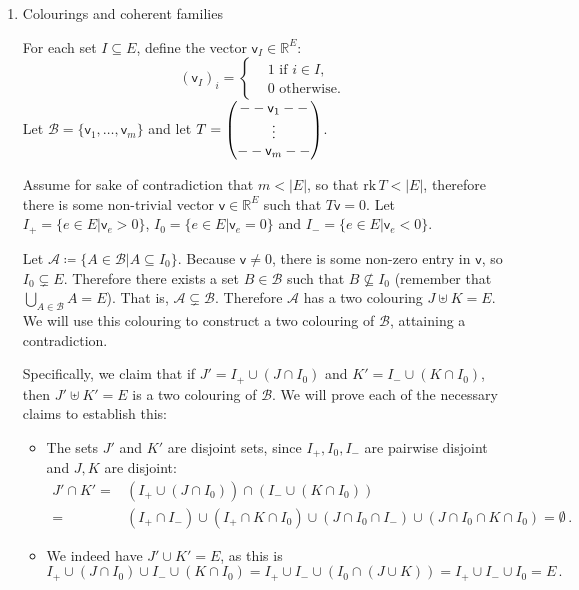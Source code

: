 \documentclass[kulak]{tplt}
\theoremstyle{definition}
\newcommand{\R}{\mathbb{R}}
\newcommand{\vv}{\mathsf{v}}
\newcommand{\rk}{\mathrm{rk}}
\begin{document}
\begin{enumerate}
\item Colourings and coherent families

For each set $I \subseteq E$, define the vector $\vv_I \in \R^E$:
$$ (\vv_I)_i =\begin{cases*}
      & 1 \text{ if $i \in I$,}\\
      & 0 \text{ otherwise.}
    \end{cases*} $$
Let $\mathcal B = \{\vv_1, \ldots, \vv_m\}$ and let $T = \begin{pmatrix}
\-- \-- \vv_1 \-- \-- \\
\vdots \\
\-- \-- \vv_m \-- \-- 
\end{pmatrix}$.

Assume for sake of contradiction that $m < |E|$, so that $\rk \, T < |E|$, therefore there is some non-trivial vector $\vv \in \R^E$ such that $T \vv = 0$.
Let $I_+ = \{e \in E | \vv_e > 0\}$, $I_0 = \{e \in E | \vv_e = 0\}$ and $I_- = \{e \in E | \vv_e < 0\}$.

Let $\mathcal A \coloneqq \{ A \in \mathcal B | A \subseteq I_0\}$.
Because $\vv \neq 0$, there is some non-zero entry in $\vv$, so $I_0\subsetneq E$.
Therefore there exists a set $B \in \mathcal B$ such that $B \not\subseteq I_0$ (remember that $\bigcup_{A \in \mathcal B} A = E$).
That is, $\mathcal A \subsetneq \mathcal B$.
Therefore $\mathcal A$ has a two colouring $J \uplus K = E$.
We will use this colouring to construct a two colouring of $\mathcal B$, attaining a contradiction.

Specifically, we claim that if $J' = I_+ \cup (J \cap I_0) $ and $K' = I_- \cup (K \cap I_0)$, then $J' \uplus K' = E$ is a two colouring of $\mathcal B$.
We will prove each of the necessary claims to establish this: 

\begin{itemize}
\item The sets $J'$ and $K'$ are disjoint sets, since $I_+, I_0, I_-$ are pairwise disjoint and $J, K$ are disjoint:
\begin{align*}
J' \cap K' =& \left( I_+ \cup (J \cap I_0) \right) \cap \left( I_- \cup (K \cap I_0) \right)\\
=& (I_+ \cap I_-) \cup (I_+ \cap K \cap I_0) \cup (J \cap I_0 \cap I_- ) \cup (J \cap I_0 \cap K \cap I_0) = \emptyset \, . 
\end{align*}

\item We indeed have $J' \cup K' = E$, as this is 
$$I_+ \cup (J \cap I_0) \cup I_- \cup (K \cap I_0) = I_+ \cup I_- \cup (I_0 \cap (J \cup K)) = I_+ \cup I_- \cup I_0 = E\, . $$


\end{itemize}
\end{enumerate}
\end{document}
